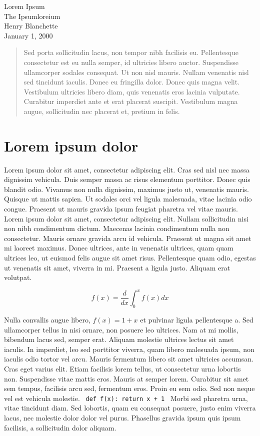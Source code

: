 \documentclass{article}
\begin{document}
\begin{center}{\huge   Lorem Ipsum }\\[0.4cm]{\large  The Ipsumloreium }\\[0.75cm]{\large  Henry Blanchette }\\[0.5cm]{\large  January 1, 2000 }\\[1.0cm]\begin{abstract} Sed porta sollicitudin lacus, non tempor nibh facilisis eu. Pellentesque consectetur est eu nulla semper, id ultricies libero auctor. Suspendisse ullamcorper sodales consequat. Ut non nisl mauris. Nullam venenatis nisl sed tincidunt iaculis. Donec eu fringilla dolor. Donec quis magna velit. Vestibulum ultricies libero diam, quis venenatis eros lacinia vulputate. Curabitur imperdiet ante et erat placerat suscipit. Vestibulum magna augue, sollicitudin nec placerat et, pretium in felis. \end{abstract}\end{center}\section{ Lorem ipsum dolor }

 Lorem ipsum dolor sit amet, consectetur adipiscing elit. Cras sed nisl nec massa dignissim vehicula. Duis semper massa ac risus elementum porttitor. Donec quis blandit odio. Vivamus non nulla dignissim, maximus justo ut, venenatis mauris. Quisque ut mattis sapien. Ut sodales orci vel ligula malesuada, vitae lacinia odio congue. Praesent ut mauris gravida ipsum feugiat pharetra vel vitae mauris. Lorem ipsum dolor sit amet, consectetur adipiscing elit. Nullam sollicitudin nisi non nibh condimentum dictum. Maecenas lacinia condimentum nulla non consectetur. Mauris ornare gravida arcu id vehicula. Praesent ut magna sit amet mi laoreet maximus. Donec ultrices, ante in venenatis ultrices, quam quam ultrices leo, ut euismod felis augue sit amet risus. Pellentesque quam odio, egestas ut venenatis sit amet, viverra in mi. Praesent a ligula justo. Aliquam erat volutpat. 

\[
    f(x) = \frac{d}{dx} \int_0^x f(x) dx
\]

 Nulla convallis augue libero, $  f(x) = 1 + x  $ et pulvinar ligula pellentesque a. Sed ullamcorper tellus in nisi ornare, non posuere leo ultrices. Nam at mi mollis, bibendum lacus sed, semper erat. Aliquam molestie ultrices lectus sit amet iaculis. In imperdiet, leo sed porttitor viverra, quam libero malesuada ipsum, non iaculis odio tortor vel arcu. Mauris fermentum libero sit amet ultricies accumsan. Cras eget varius elit. Etiam facilisis lorem tellus, ut consectetur urna lobortis non. Suspendisse vitae mattis eros. Mauris at semper lorem. Curabitur sit amet sem tempus, facilisis arcu sed, fermentum eros. Proin eu sem odio. Sed non neque vel est vehicula molestie. \texttt{ def f(x): return x + 1 } Morbi sed pharetra urna, vitae tincidunt diam. Sed lobortis, quam eu consequat posuere, justo enim viverra lacus, nec molestie dolor dolor vel purus. Phasellus gravida ipsum quis ipsum facilisis, a sollicitudin dolor aliquam. 
\end{document}
